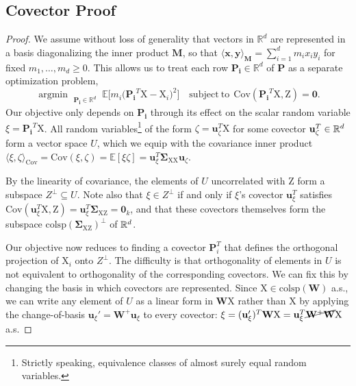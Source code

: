 \documentclass{article}
\theoremstyle{plain}
\theoremstyle{remark}
\newcommand{\sxx}{\mathbf \Sigma_{\rv X \rv X}}
\newcommand{\sxz}{\mathbf \Sigma_{\rv X \rv Z}}
\newcommand{\E}{\mathbb E}
\newcommand{\R}{\mathbb{R}}
\theoremstyle{plain}
\theoremstyle{TheoremNum}
\newcommand{\rv}[1]{{\mathrm{#1}}}
\renewcommand{\R}{{\color{black} \mathbb{R}}}
\begin{document}
\subsection{Covector Proof}\label{covector-proof}

\begin{proof}
     We assume without loss of generality that vectors in $\mathbb R^d$ are represented in a basis diagonalizing the inner product $\mathbf{M}$, so that $\langle \mathbf{x}, \mathbf{y} \rangle_\mathbf{M} = \sum_{i=1}^d m_{i}x_iy_i$ for fixed $m_1, \ldots, m_d \ge 0$. This allows us to treat each row $\mathbf{P_i} \in \mathbb R^d$ of $\mathbf{P}$ as a separate optimization problem,
    \begin{equation*}
    \mathop{\mathrm{argmin\:}}_{\substack{\mathbf{P_i} \in \mathbb{R}^d}} \E \Big [ m_i \big( \mathbf{P_i}^T\rv X - \rv X_i \big)^2 \Big ]\quad \mathrm{subject\:to}\:\: \mathrm{Cov}(\mathbf{P_i}^T\rv X, \rv Z) = \mathbf{0}.
    \end{equation*}
    Our objective only depends on $\mathbf{P_i}$ through its effect on the scalar random variable $\xi = \mathbf{P_i}^T\rv X$. All random variables\footnote{Strictly speaking, equivalence classes of almost surely equal random variables.} of the form $\zeta = \mathbf{u}_{\zeta}^T \rv X$ for some covector $\mathbf{u}_{\zeta}^T \in \R^d$ form a vector space $U$, which we equip with the covariance inner product $\langle \xi, \zeta\rangle_\mathrm{Cov} = \mathrm{Cov}(\xi, \zeta) = \E[\xi \zeta] = \mathbf{u}_\xi^T \sxx \mathbf{u}_\zeta$.

    By the linearity of covariance, the elements of $U$ uncorrelated with $\rv Z$ form a subspace $Z^\perp \subseteq U$. Note also that $\xi \in Z^\perp$ if and only if $\xi$'s covector $\mathbf{u}_\xi^T$ satisfies $\mathrm{Cov}(\mathbf{u}_\xi^T \rv X, \rv Z) = \mathbf{u}_\xi^T \sxz = \mathbf{0}_k$, and that these covectors themselves form the subspace $\mathrm{colsp}(\sxz)^\perp$ of $\R^d$.
    
    Our objective now reduces to finding a covector $\mathbf{P}_i^T$ that defines the orthogonal projection of $\rv X_i$ onto $Z^\perp$. The difficulty is that orthogonality of elements in $U$ is not equivalent to orthogonality of the corresponding covectors. We can fix this by changing the basis in which covectors are represented. Since $\rv X \in \mathrm{colsp}(\mathbf{W})$ a.s., we can write any element of $U$ as a linear form in $\mathbf{W}\rv X$ rather than $\rv X$ by applying the change-of-basis $\mathbf{u}_{\xi}' = \mathbf{W}^+ \mathbf{u}_{\xi}$ to every covector: $\xi = (\mathbf{u}_{\xi}')^T \mathbf{W}\rv X = \mathbf{u}_{\xi}^T \cancel{\mathbf{W}^+ \mathbf{W}} \rv X$ a.s.
    

\end{proof}
\end{document}
